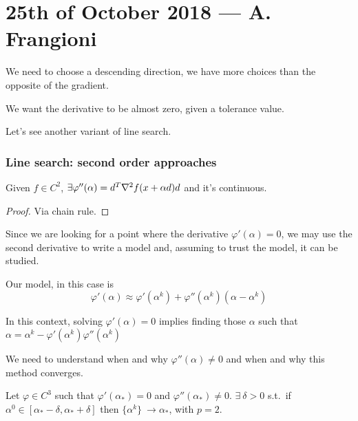 \documentclass[computational_mathematics.tex]{subfiles}
\begin{document}
\section{25th of October 2018 --- A. Frangioni}

We need to choose a descending direction, we have more choices than the opposite of the gradient.

We want the derivative to be almost zero, given a tolerance value. 

Let's see another variant of line search.

\subsubsection{Line search: second order approaches}

\begin{theorem}
  Given $f \in C^2$,  $\exists \varphi''(\alpha) = {d}^{T} \nabla^{2} f(x + \alpha d ) d$ and it's continuous.
\end{theorem}
\begin{proof}
Via chain rule.
\end{proof}

Since we are looking for a point where the derivative $\varphi'(\alpha) = 0$, we may use the second derivative to write a model and, assuming to trust the model, it can be studied.

\begin{definition}
Our model, in this case is
  \[
    \varphi'(\alpha) \approx \varphi'(\alpha^k) + \varphi''(\alpha^k)(\alpha - \alpha^k)
  \]
\end{definition}

In this context, solving $\varphi'(\alpha) = 0$ implies finding those $\alpha$ such that $\alpha = \alpha^k - \varphi'(\alpha^k) \varphi''(\alpha^k)$ 


We need to understand when and why $\varphi''(\alpha) \ne 0$ and when and why this method converges.
\begin{theorem}
Let $\varphi \in C^{3}$ such that $\varphi'(\alpha_*) = 0$ and $\varphi''(\alpha_*) \neq 0$. $\exists~\delta > 0$ s.t.~if $\alpha^0 \in [\alpha_* - \delta, \alpha_* + \delta]$ then $\{\alpha^k \}~\to \alpha_*$, with $p = 2$.
\end{theorem}
\end{document}
